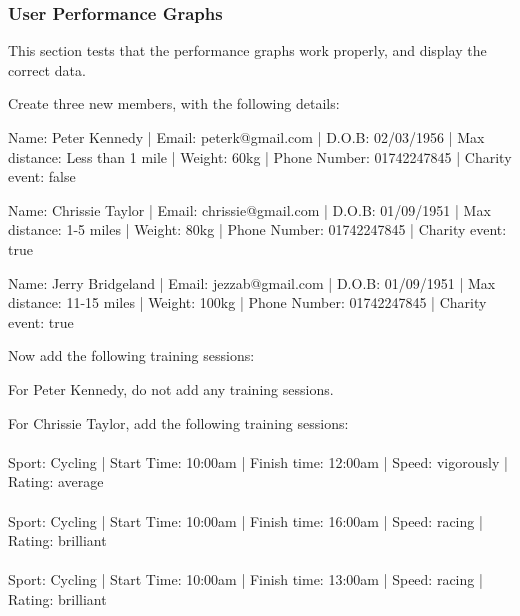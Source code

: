 \documentclass{article}[12pt,a4paper]
\begin{document}
\subsubsection{User Performance Graphs}
This section tests that the performance graphs work properly, and display the correct data.

{\setlength{\parindent}{0cm}
Create three new members, with the following details:

\begin{framed}
Name: Peter Kennedy | Email: peterk@gmail.com | D.O.B: 02/03/1956 | Max distance: Less than 1 mile | Weight: 60kg | Phone Number: 01742247845 | Charity event: false
\end{framed}

\begin{framed}
Name: Chrissie Taylor | Email: chrissie@gmail.com | D.O.B: 01/09/1951 | Max distance:  1-5 miles | Weight: 80kg | Phone Number: 01742247845 | Charity event: true
\end{framed}

\begin{framed}
Name: Jerry Bridgeland | Email: jezzab@gmail.com | D.O.B: 01/09/1951 | Max distance:  11-15 miles | Weight: 100kg | Phone Number: 01742247845 | Charity event: true
\end{framed}

Now add the following training sessions:

\begin{framed}
For Peter Kennedy, do not add any training sessions.
\end{framed}

\begin{framed}
For Chrissie Taylor, add the following training sessions:\\\\
Sport: Cycling | Start Time: 10:00am | Finish time: 12:00am | Speed: vigorously | Rating: average\\\\
Sport: Cycling | Start Time: 10:00am | Finish time: 16:00am | Speed: racing | Rating: brilliant\\\\
Sport: Cycling | Start Time: 10:00am | Finish time: 13:00am | Speed: racing | Rating: brilliant
\end{framed}

}
\end{document}
